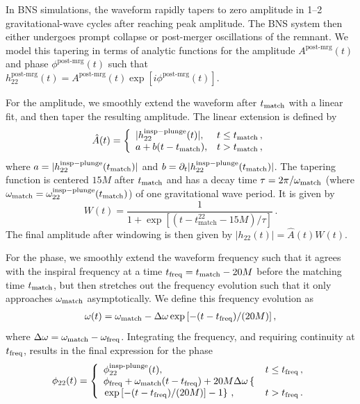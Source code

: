 \documentclass[prd,aps,letter,twocolumn,floatfix,notitlepage,nofootinbib]{revtex4-1}
\begin{document}
In BNS simulations, the waveform rapidly tapers to zero amplitude in 1--2 gravitational-wave cycles after reaching peak amplitude. The BNS system then either undergoes prompt collapse or post-merger oscillations of the remnant. We model this tapering in terms of analytic functions for the amplitude $A^{\textrm{post-mrg}}(t)$ and phase $\phi^{\textrm{post-mrg}}(t)$ such that $h_{22}^{\textrm{post-mrg}}(t) = A^{\textrm{post-mrg}}(t) \exp{[i\phi^{\textrm{post-mrg}}(t)]}$. 

For the amplitude, we smoothly extend the waveform after $t_{\rm match}$ with a linear fit, and then taper the resulting amplitude. The linear extension is defined by
\begin{align}
\hat{A}(t)=\left\{\begin{array}{ll}
|h_{22}^{\rm insp-plunge}(t)|, & t \leq t_{\rm match}\,, \\
a + b (t - t_{\rm match}), & t > t_{\rm match}\,,
\end{array}\right.
\end{align}
where $a = |h_{22}^{\rm insp-plunge}(t_{\rm match})|$ and $b=\partial_t |h_{22}^{\rm insp-plunge}(t_{\rm match})|$. The tapering function is centered $15M$ after $t_{\rm match}$ and has a decay time $\tau = 2\pi / \omega_{\rm match}$ (where $\omega_{\rm match} = \omega_{22}^{\rm insp-plunge}(t_{\rm match})$) of one gravitational wave period. It is given by
\begin{equation}
W(t) = \frac{1}{1+\exp{[(t- t^{22}_{\textrm{match}}-15M)/\tau]}}\,.
\end{equation}
The final amplitude after windowing is then given by $|h_{22}(t)| = \hat A(t) W(t)$.

For the phase, we smoothly extend the waveform frequency such that it agrees with the inspiral frequency at a time $t_{\rm freq} = t_{\rm match} - 20M$ before the matching time $t_{\rm match}$, but then stretches out the frequency evolution such that it only approaches $\omega_{\rm match}$ asymptotically. We define this frequency evolution as
\begin{align}
\omega(t) = \omega_{\rm match} - \Delta\omega \exp\left[ -(t - t_{\rm freq}) / (20M) \right],
\end{align}
where $\Delta\omega = \omega_{\rm match} - \omega_{\rm freq}$. Integrating the frequency, and requiring continuity at $t_{\rm freq}$, results in the final expression for the phase
\begin{align}
\phi_{22}(t) = \left\{\begin{array}{ll}
\phi_{22}^{\textrm{insp-plunge}}(t), & t \leq t_{\rm freq} \,, \\
\phi_{\rm freq} + \omega_{\rm match}(t - t_{\rm freq}) + 20M \Delta\omega \left\{ \right. & \\
  \left. \exp\left[ -(t - t_{\rm freq}) / (20M) \right] - 1\right\} \,,& t > t_{\rm freq} \, .
\end{array}\right.
\end{align}
\end{document}
